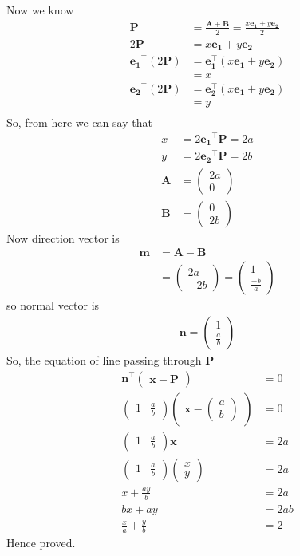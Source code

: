 \documentclass[12pt]{article}
\providecommand{\brak}[1]{\ensuremath{\left(#1\right)}}
\newcommand{\myvec}[1]{\ensuremath{\begin{pmatrix}#1\end{pmatrix}}}
\let\vec\mathbf
\begin{document}
Now we know
\begin{align}
	\vec{P}&=\frac{\vec{A}+\vec{B}}{2}=\frac{x\vec{e_{1}}+y\vec{e_{2}}}{2}\\
	2\vec{P}&=x\vec{e_{1}}+y\vec{e_{2}}\\
	\vec{e_{1}}^{\top}\brak{2\vec{P}}&=\vec{e_{1}^{\top}}\brak{x\vec{e_{1}}+y\vec{e_{2}}}\\
					 &=x\\				 
	\vec{e_{2}}^{\top}\brak{2\vec{P}}&=\vec{e_{2}^{\top}}\brak{x\vec{e_{1}}+y\vec{e_{2}}}\\
					 &=y\\				 
\end{align}
So, from here we can say that
\begin{align}
	x&=2\vec{e_{1}}^{\top}\vec{P}=2a\\
	y&=2\vec{e_{2}}^{\top}\vec{P}=2b\\
	\vec{A} &= \myvec{2a\\0}\\
	\vec{B} &= \myvec{0\\2b}
\end{align}
Now direction vector is
\begin{align}
	\vec{m} &= \vec{A}-\vec{B}\\
		&= \myvec{2a\\-2b} = \myvec{1\\\frac{-b}{a}}
\end{align}
so normal vector is
\begin{align}
	\vec{n} = \myvec{1\\\frac{a}{b}}
\end{align}
So, the equation of line passing through $\vec{P}$
\begin{align}
	\vec{n}^{\top} \myvec{\vec{x}-\vec{P}} &= 0\\
	\myvec{1 & \frac{a}{b}}\myvec{\vec{x}-\myvec{a\\b}}&=0\\
	\myvec{1 & \frac{a}{b}}\vec{x}&=2a\\
	\myvec{1 & \frac{a}{b}}\myvec{x\\y}&=2a\\
	x+\frac{ay}{b}&=2a\\
	bx+ay&=2ab\\
	\frac{x}{a}+\frac{y}{b}&=2
\end{align}
Hence proved.
\end{document}
